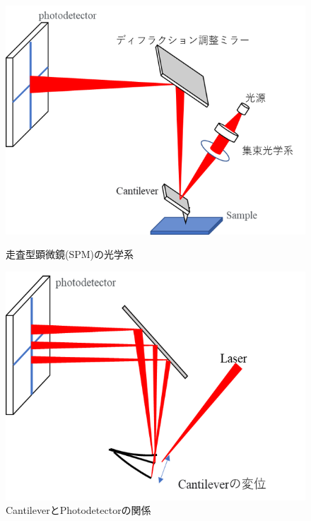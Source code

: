 \documentclass[dvipdfmx,12pt,a4paper]{jreport}
\begin{document}
			\begin{figure}[h]
				\centering
				\begin{minipage}{0.45\hsize}
					\centering
					\includegraphics[width=\linewidth]{SPM.png}
					\caption{走査型顕微鏡(SPM)の光学系}
					\label{SPM}
				\end{minipage}
				\begin{minipage}{0.45\hsize}
					\centering
					\includegraphics[width=\linewidth]{SPM2.png}
					\caption{CantileverとPhotodetectorの関係}
					\label{cantilever_photo_detector}
				\end{minipage}
			\end{figure}
\end{document}
